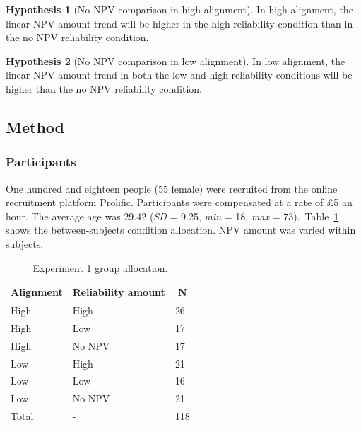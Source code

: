 \documentclass[a4paper, nobind, dvipsnames]{templates/ociamthesis}
\theoremstyle{definition}
\theoremstyle{definition}
\theoremstyle{definition}
\theoremstyle{definition}
\newtheorem{hypothesis}{Hypothesis}[chapter]
\theoremstyle{remark}
\begin{document}
\begin{hypothesis}[No NPV comparison in high alignment]
\protect\hypertarget{hyp:allocation-alignment-high-no-NPV-alignment-2}{}{\label{hyp:allocation-alignment-high-no-NPV-alignment-2} {} }In high alignment, the linear NPV amount trend will be higher in the high
reliability condition than in the no NPV reliability condition.
\end{hypothesis}

\begin{hypothesis}[No NPV comparison in low alignment]
\protect\hypertarget{hyp:allocation-alignment-low-no-NPV-alignment-2}{}{\label{hyp:allocation-alignment-low-no-NPV-alignment-2} {} }In low alignment, the linear NPV amount trend in both the low and high
reliability conditions will be higher than the no NPV reliability condition.
\end{hypothesis}

\subsection{Method}

\subsubsection{Participants}

One hundred and eighteen people (55 female) were recruited from the online recruitment platform Prolific. Participants were compensated at a rate of £5 an hour. The average age was 29.42 (\emph{SD} = 9.25, \emph{min} = 18, \emph{max} = 73).~Table~\ref{tab:condition-allocation-alignment-2}
shows the between-subjects condition allocation. NPV amount was varied within
subjects.

\begin{table}[tbp]

\begin{center}
\begin{threeparttable}

\caption{\label{tab:condition-allocation-alignment-2}Experiment 1 group allocation.}

\begin{tabular}{lll}
\toprule
Alignment & \multicolumn{1}{c}{Reliability amount} & \multicolumn{1}{c}{N}\\
\midrule
High & High & 26\\
High & Low & 17\\
High & No NPV & 17\\
Low & High & 21\\
Low & Low & 16\\
Low & No NPV & 21\\
Total & - & 118\\
\bottomrule
\end{tabular}

\end{threeparttable}
\end{center}

\end{table}
\end{document}
